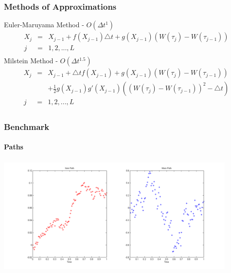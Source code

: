 \begin{frame}
    \frametitle{Methods of Approximations}
	Euler-Maruyama Method - $O(\Delta t^{1})$
	\begin{eqnarray*}
		X_{j} &=& X_{j-1} + f(X_{j-1})\triangle t+ g(X_{j-1})(W(\tau_{j})-W(\tau_{j-1})) \\
		 j &=& 1,2,... ,L \\
	\end{eqnarray*}
	Milstein Method - $O(\Delta t^{1.5})$
	\begin{eqnarray*}

		X_{j} &=& X_{j-1} + \triangle tf(X_{j-1}) + g(X_{j-1})(W(\tau_{j})-W(\tau_{j-1})) 	\nonumber\\ 
		&& + \frac{1}{2} g(X_{j-1})g'(X_{j-1})((W(\tau_{j})-W(\tau_{j-1}))^{2}-\triangle t)\\
		 j &=& 1,2,... ,L \\
	\end{eqnarray*}
\end{frame}


\begin{frame}
    \frametitle{Benchmark}
	\framesubtitle{Paths}
\vspace{-5mm}
\includegraphics[height=6cm,width=12cm]{testpaths} 
\end{frame}


